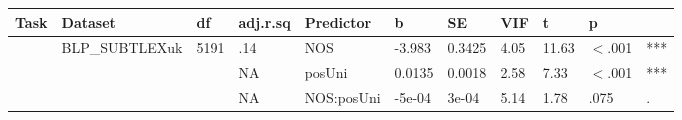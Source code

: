 \begin{table}[ht]
\centering
\begingroup\normalsize
\begin{tabular}{lllllllllll}
  \hline
Task & Dataset & df & adj.r.sq & Predictor & b & SE & VIF & t & p &  \\ 
  \hline
 & BLP\_SUBTLEXuk & 5191 & .14 & NOS & -3.983 & 0.3425 & 4.05 & 11.63 & $<$.001 & *** \\ 
   &  &  & NA & posUni & 0.0135 & 0.0018 & 2.58 & 7.33 & $<$.001 & *** \\ 
   &  &  & NA & NOS:posUni & -5e-04 & 3e-04 & 5.14 & 1.78 & .075 & . \\ 
   \hline
\end{tabular}
\endgroup
\end{table}
